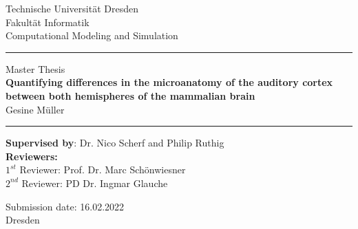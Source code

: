 \documentclass[12pt,oneside,ngerman,reqno,a4paper]{article}
\numberwithin{equation}{section}
\begin{document}
\renewcommand{\thepage}{C-\Roman{page}}


\begin{titlepage}
	\begin{center}
		
		\LARGE{}{Technische Universität Dresden} \\
		\LARGE{Fakultät Informatik} \\
		\vspace{0.2cm}
		\Large{Computational Modeling and Simulation} \\
		
		\vspace{1.5cm}
		\noindent\rule{\textwidth}{1.5pt}
		\vspace{0.2cm}
		
		\LARGE{Master Thesis} \\ %
		\vspace{0.8cm}
		\LARGE{\textbf{Quantifying differences in the microanatomy of the auditory cortex between both hemispheres of the mammalian brain}} \\
		\vspace{0.8cm}
		\Large{Gesine Müller}\\
		\vspace{0.8cm}
		\noindent\rule{\textwidth}{1.5pt}
	\end{center}
	
	\vspace{1.2cm}
	
	\normalsize{\textbf{Supervised by}:  Dr. Nico Scherf and Philip Ruthig} \\
	
	\vspace{0.2cm}
	\normalsize{\textbf{Reviewers:}}\\
	\normalsize{$1^{st}$ Reviewer: Prof. Dr. Marc Schönwiesner} \\
	\normalsize{$2^{nd}$ Reviewer: PD Dr. Ingmar Glauche}\\
	
	\vspace*{\fill}
	\begin{center}
		\normalsize{Submission date: 16.02.2022} \\
		\normalsize{Dresden} 
	\end{center}
	

\end{titlepage}
\end{document}
